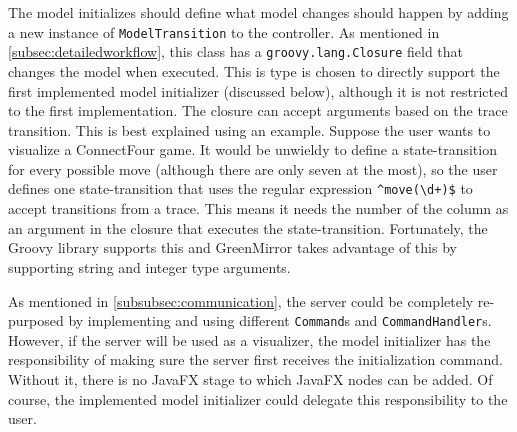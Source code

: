 \documentclass[a4paper]{article}
\begin{document}
The model initializes should define what model changes should happen by adding a new instance of \lstinline{ModelTransition} to the controller. As mentioned in \cref{subsec:detailedworkflow}, this class has a \lstinline{groovy.lang.Closure} field that changes the model when executed. This is type is chosen to directly support the first implemented model initializer (discussed below), although it is not restricted to the first implementation. The closure can accept arguments based on the trace transition. This is best explained using an example. Suppose the user wants to visualize a ConnectFour game. It would be unwieldy to define a state-transition for every possible move (although there are only seven at the most), so the user defines one state-transition that uses the regular expression \lstinline{^move(\d+)$} to accept transitions from a trace. This means it needs the number of the column as an argument in the closure that executes the state-transition. Fortunately, the Groovy library supports this and GreenMirror takes advantage of this by supporting string and integer type arguments.

As mentioned in \cref{subsubsec:communication}, the server could be completely re-purposed by implementing and using different \lstinline{Command}s and \lstinline{CommandHandler}s. However, if the server will be used as a visualizer, the model initializer has the responsibility of making sure the server first receives the initialization command. Without it, there is no JavaFX stage to which JavaFX nodes can be added. Of course, the implemented model initializer could delegate this responsibility to the user.
\end{document}
